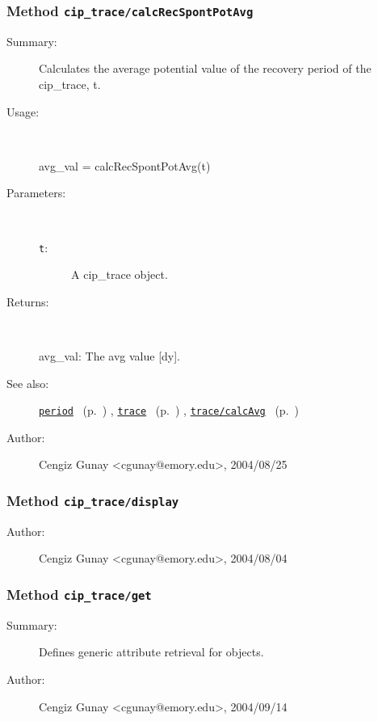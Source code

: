 \subsubsection[Method \texttt{calcRecSpontPotAvg}]{Method \texttt{cip\_trace/calcRecSpontPotAvg}}%
%
\label{ref_cip_trace__calcRecSpontPotAvg}%
\hypertarget{ref_cip_trace__calcRecSpontPotAvg}{}%
\begin{description}
\item[Summary:]Calculates the average potential value of the 
			recovery period of the cip\_trace, t. 
%
\item[Usage:]~%
\begin{lyxcode}%
avg\_val = calcRecSpontPotAvg(t)
%
\end{lyxcode}%
%
%
\item[Parameters:]~
\begin{description}%
\item[\texttt{t}:]
 A cip\_trace object.
\end{description}%
%
\item[Returns:
]~

	avg\_val: The avg value [dy].
%
%
\item[See also:]%
\hyperlink{ref_period}{\texttt{period}}%
\ (p.~\pageref{ref_period})%
%
, \hyperlink{ref_trace}{\texttt{trace}}%
\ (p.~\pageref{ref_trace})%
%
, \hyperlink{ref_trace__calcAvg}{\texttt{trace/calcAvg}}%
\ (p.~\pageref{ref_trace__calcAvg})%
%
%
\item[Author:]%
Cengiz Gunay <cgunay@emory.edu>, 2004/08/25
%
\end{description}
\methodline%
\subsubsection[Method \texttt{display}]{Method \texttt{cip\_trace/display}}%
%
\label{ref_cip_trace__display}%
\hypertarget{ref_cip_trace__display}{}%
\begin{description}
%
%
%
%
%
%
%
\item[Author:]%
Cengiz Gunay <cgunay@emory.edu>, 2004/08/04
%
\end{description}
\methodline%
\subsubsection[Method \texttt{get}]{Method \texttt{cip\_trace/get}}%
%
\label{ref_cip_trace__get}%
\hypertarget{ref_cip_trace__get}{}%
\begin{description}
\item[Summary:]Defines generic attribute retrieval for objects.
%
%
%
%
%
%
%
\item[Author:]%
Cengiz Gunay <cgunay@emory.edu>, 2004/09/14
%
\end{description}
\methodline%
